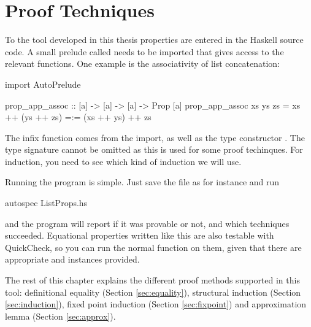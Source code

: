 \chapter{Proof Techniques}
\label{ch:proofs}

To the tool developed in this thesis properties are entered in the
Haskell source code. A small prelude called  needs to
be imported that gives access to the relevant functions. One example
is the associativity of list concatenation:

\begin{code}
import AutoPrelude

prop_app_assoc :: [a] -> [a] -> [a] -> Prop [a]
prop_app_assoc xs ys zs = xs ++ (ys ++ zs) =:= (xs ++ ys) ++ zs
\end{code}

The infix function \hs{=:=} comes from the import, as well as the type
constructor . The type signature cannot be omitted as this is
used for some proof techinques. For induction, you need to see which
kind of induction we will use.

Running the program is simple. Just save the file as for instance
 and run

\begin{code}
autospec ListProps.hs
\end{code}

\noindent
and the program will report if it was provable or not, and which
techniques succeeded. Equational properties written like this are also
testable with QuickCheck, so you can run the normal 
function on them, given that there are appropriate  and
 instances provided.

The rest of this chapter explains the different proof methods
supported in this tool: definitional equality (Section
\ref{sec:equality}), structural induction (Section
\ref{sec:induction}), fixed point induction (Section
\ref{sec:fixpoint}) and approximation lemma (Section
\ref{sec:approx}).










